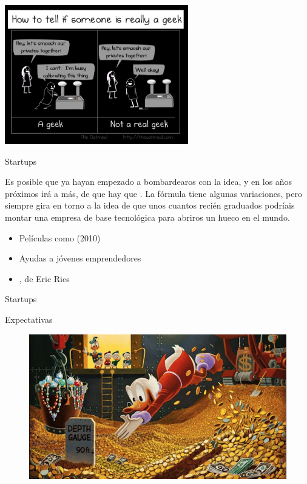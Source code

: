 \documentclass[14pt]{beamer}
\begin{document}
\begin{frame}{}
  \begin{center}
    \includegraphics[width=0.6\textwidth]{pics/the-oatmeal-real-geeks.jpg}
  \end{center}
\end{frame}

\begin{frame}{Startups}
  \begin{block}{} \centering
    Es posible que ya hayan empezado a bombardearos con la idea, y en los
    años próximos irá a más, de que hay que .
    La fórmula tiene algunas variaciones, pero siempre gira en torno a
    la idea de que unos cuantos recién graduados podríais montar una
    empresa de base tecnológica para abriros un hueco en el mundo.
  \end{block}

  \begin{itemize} \small
    \item Películas como  (2010)
    \item Ayudas a jóvenes emprendedores
    \item {}, de Eric Ries
  \end{itemize}
\end{frame}

\begin{frame}{Startups}
    \begin{block}{}
    \centering \Large Expectativas
  \end{block}

  \begin{figure}
    \centering
    \includegraphics[width=0.75\paperwidth]{pics/scrooge-mcduck.jpg}
  \end{figure}
\end{frame}
\end{document}

